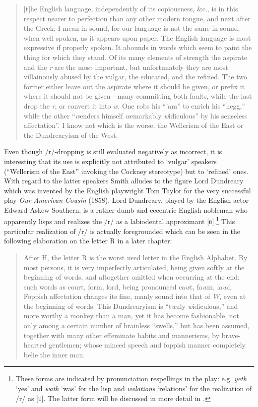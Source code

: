 \begin{quote}
[t]he English language, independently of its copiousness, \&c., is in this respect nearer to perfection than any other modern tongue, and next after the Greek; I mean in sound, for our language is not the same in sound, when well spoken, as it appears upon paper. The English language is most expressive if properly spoken. It abounds in words which seem to paint the thing for which they stand. Of its many elements of strength the aspirate and the \emph{r} are the most important, but unfortunately they are most villainously abused by the vulgar, the educated, and the refined. The two former either leave out the aspirate where it should be given, or prefix it where it should not be given—many committing both faults, while the last drop the \emph{r}, or convert it into \emph{w}. One robs his “’am” to enrich his “hegg,” while the other “\emph{w}enders himself \emph{w}emarkably \emph{w}idiculous” by his senseless affectation”. I know not which is the worse, the Wellerism of the East or the Dundrearyism of the West. \citep[5]{Smith1866}
\end{quote}

Even though /r/-dropping is still evaluated negatively as incorrect, it is interesting that its use is explicitly not attributed to ‘vulgar’ speakers (“Wellerism of the East” invoking the Cockney stereotype) but to ‘refined’ ones. With regard to the latter speakers Smith alludes to the figure Lord Dundreary which was invented by the English playwright Tom Taylor for the very successful play \emph{Our American Cousin} (1858). Lord Dundreary, played by the English actor Edward Askew Southern, is a rather dumb and eccentric English nobleman who apparently lisps and realizes the /r/ as a labiodental approximant [ʋ].\footnote{These forms are indicated by pronunciation respellings in the play: e.g. \emph{yeth} ‘yes’ and \emph{wath} ‘was’ for the lisp and \emph{welations} ‘relations’ for the realization of /r/ as [ʋ]. The latter form will be discussed in more detail in .} This particular realization of /r/ is actually foregrounded which can be seen in the following elaboration on the letter R in a later chapter:

\begin{quote}
After H, the letter R is the worst used letter in the English Alphabet. By most persons, it is very imperfectly articulated, being given softly at the beginning of words, and altogether omitted when occurring at the end; such words as court, form, lord, being pronounced ca\emph{w}t, fa\emph{w}m, la\emph{w}d. Foppish affectation changes its fine, manly sound into that of \emph{W}, even at the beginning of words. This Dundrearyism is “t\emph{w}uly \emph{w}idiculous,” and more worthy a monkey than a man, yet it has become fashionable, not only among a certain number of brainless “swells,” but has been assumed, together with many other effeminate habits and mannerisms, by brave-hearted gentlemen; whose minced speech and foppish manner completely belie the inner man. \citep[29]{Smith1866}
\end{quote}

